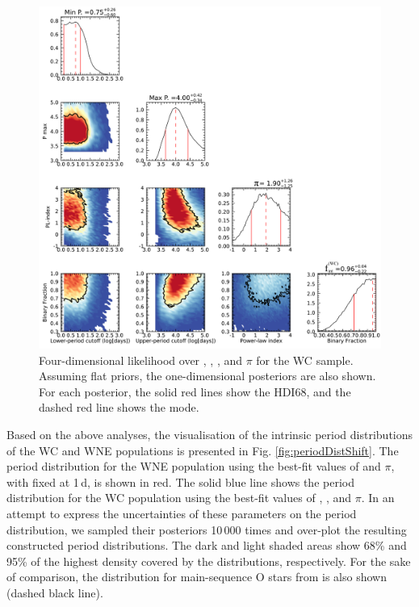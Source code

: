 \begin{figure}[t]
    \centering
    \includegraphics[width=\hsize]{chapters/WNE/image/WC_posterior.png}
    \caption{Four-dimensional likelihood over \logPmin{}, \logPmax{}, \fintWNE{} , and $\pi$ for the WC sample. Assuming flat priors, the one-dimensional posteriors are also shown. For each posterior, the solid red lines show the HDI68, and the dashed red line shows the mode.}
    \label{fig:WC_posteriors}
\end{figure}

Based on the above analyses, the visualisation of the intrinsic period distributions of the WC and WNE populations is presented in Fig. \ref{fig:periodDistShift}. The period distribution for the WNE population using the best-fit values of \logPmax{} and $\pi$, with \Pmin{} fixed at 1\,d, is shown in red. The solid blue line shows the period distribution for the WC population using the best-fit values of \logPmin{}, \logPmax{} , and $\pi$. In an attempt to express the uncertainties of these parameters on the period distribution, we sampled their posteriors 10\,000 times and over-plot the resulting constructed period distributions. The dark and light shaded areas show 68\% and 95\% of the highest density covered by the distributions, respectively. For the sake of comparison, the distribution for main-sequence O stars from \citet{2012Sana} is also shown (dashed black line).

